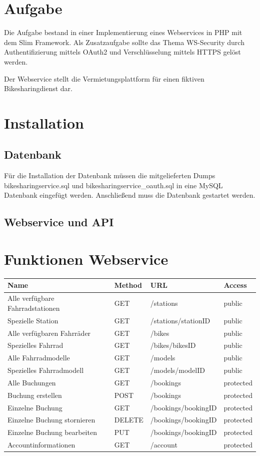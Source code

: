 \chapter{Aufgabe}

Die Aufgabe bestand in einer Implementierung eines Webservices in PHP mit dem Slim Framework.
Als Zusatzaufgabe sollte das Thema WS-Security durch Authentifizierung mittels OAuth2 und Verschlüsselung mittels HTTPS gelöst werden.

Der Webservice stellt die Vermietungsplattform für einen fiktiven Bikesharingdienst dar.

\chapter{Installation}
\section{Datenbank}
Für die Installation der Datenbank müssen die mitgelieferten Dumps bikesharingservice.sql und bikesharingservice\_oauth.sql in eine MySQL Datenbank eingefügt werden.
Anschließend muss die Datenbank gestartet werden.
\section{Webservice und API}


\chapter{Funktionen Webservice}

\begin{tabularx}{\columnwidth}{|X|p{1.5cm}|X|p{1.5cm}|}
	\hline
	Name & Method & URL & Access \\
	\hline
	\hline
	Alle verfügbare Fahrradstationen & GET & /stations & public \\
	\hline
	Spezielle Station & GET & /stations/stationID & public \\
	\hline
	Alle verfügbaren Fahrräder & GET & /bikes & public \\
	\hline
	Spezielles Fahrrad & GET & /bikes/bikesID & public \\
	\hline
	Alle Fahrradmodelle & GET & /models & public \\
	\hline
	Spezielles Fahrradmodell & GET & /models/modelID & public \\
	\hline
	Alle Buchungen & GET & /bookings & protected \\
	\hline
	Buchung erstellen & POST & /bookings & protected \\
	\hline
	Einzelne Buchung & GET & /bookings/bookingID & protected \\
	\hline
	Einzelne Buchung stornieren & DELETE & /bookings/bookingID & protected \\
	\hline
	Einzelne Buchung bearbeiten & PUT & /bookings/bookingID & protected \\
	\hline
	Accountinformationen & GET & /account & protected \\
	\hline
\end{tabularx}

